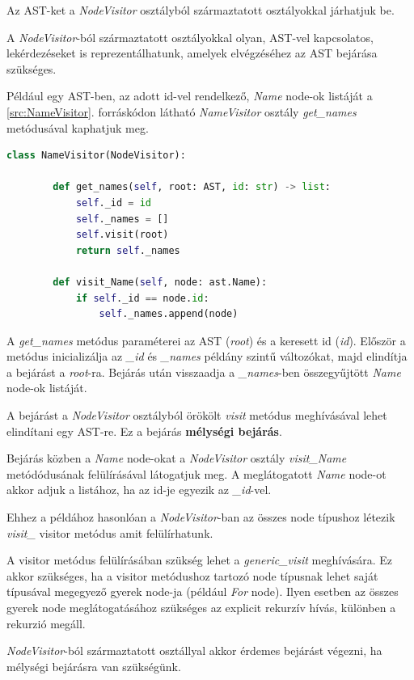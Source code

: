 Az AST-ket a \emph{NodeVisitor} osztályból származtatott osztályokkal járhatjuk be.

A \emph{NodeVisitor}-ból származtatott osztályokkal olyan, AST-vel kapcsolatos,
lekérdezéseket is reprezentálhatunk, amelyek elvégzéséhez az AST bejárása szükséges.

Például egy AST-ben, az adott id-vel rendelkező, \emph{Name} node-ok listáját
a \ref{src:NameVisitor}. forráskódon látható \emph{NameVisitor} osztály
\emph{get\_names} metódusával kaphatjuk meg.

\begin{lstlisting}[language={Python}]
	class NameVisitor(NodeVisitor):
		
		def get_names(self, root: AST, id: str) -> list:
			self._id = id
			self._names = []
			self.visit(root)
			return self._names
		
		def visit_Name(self, node: ast.Name):
			if self._id == node.id:
				self._names.append(node)
\end{lstlisting}

A \emph{get\_names} metódus paraméterei az AST (\emph{root}) és a keresett id (\emph{id}).
Először a metódus inicializálja az \emph{\_id} és \emph{\_names} példány szintű változókat,
majd elindítja a bejárást a \emph{root}-ra.
Bejárás után visszaadja a \emph{\_names}-ben összegyűjtött \emph{Name} node-ok listáját.

A bejárást a \emph{NodeVisitor} osztályból örökölt \emph{visit} metódus meghívásával
lehet elindítani egy AST-re. Ez a bejárás \textbf{mélységi bejárás}.

Bejárás közben a \emph{Name} node-okat a \emph{NodeVisitor} osztály \emph{visit\_Name}
metódódusának felülírásával látogatjuk meg.
A meglátogatott \emph{Name} node-ot akkor adjuk a listához,
ha az id-je egyezik az \emph{\_id}-vel.

Ehhez a példához hasonlóan a \emph{NodeVisitor}-ban az összes node típushoz
létezik \emph{visit\_<node-class>} visitor metódus amit felülírhatunk.

A visitor metódus felülírásában szükség lehet a \emph{generic\_visit} meghívására.
Ez akkor szükséges, ha a visitor metódushoz tartozó node típusnak
lehet saját típusával megegyező gyerek node-ja (például \emph{For} node).
Ilyen esetben az összes gyerek node meglátogatásához szükséges az explicit rekurzív hívás,
különben a rekurzió megáll.

\emph{NodeVisitor}-ból származtatott osztállyal akkor érdemes bejárást végezni,
ha mélységi bejárásra van szükségünk.

